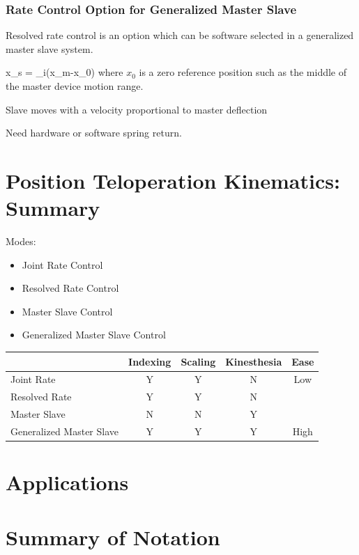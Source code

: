 \subsubsection{Rate Control Option for Generalized Master Slave}


Resolved rate control is an option which can be software selected in a generalized master slave system.	%

\bq
\Delta x_s = \alpha_i(x_m-x_0)
\eq
where $x_0$ is a zero reference position such as the middle of the master device motion range.	%

Slave moves with a velocity proportional to master deflection

Need hardware or software spring return.


\section{Position Teloperation Kinematics: Summary}

Modes:

\begin{itemize}
	\item Joint Rate Control
	\item Resolved Rate Control
	\item Master Slave Control
	\item Generalized Master Slave Control
\end{itemize}


\begin{tabular}{l|cccc}
                & Indexing         & Scaling        & Kinesthesia      & Ease   \\ \hline
Joint Rate      &    Y             &   Y            &    N             &  Low     \\
Resolved Rate   &    Y             &   Y            &    N             &        \\
Master Slave    &    N             &   N            &    Y             &        \\
Generalized Master Slave
                &    Y             &   Y            &    Y             & High  \\ \hline
\end{tabular}






\section{Applications}


\section{Summary of Notation}



